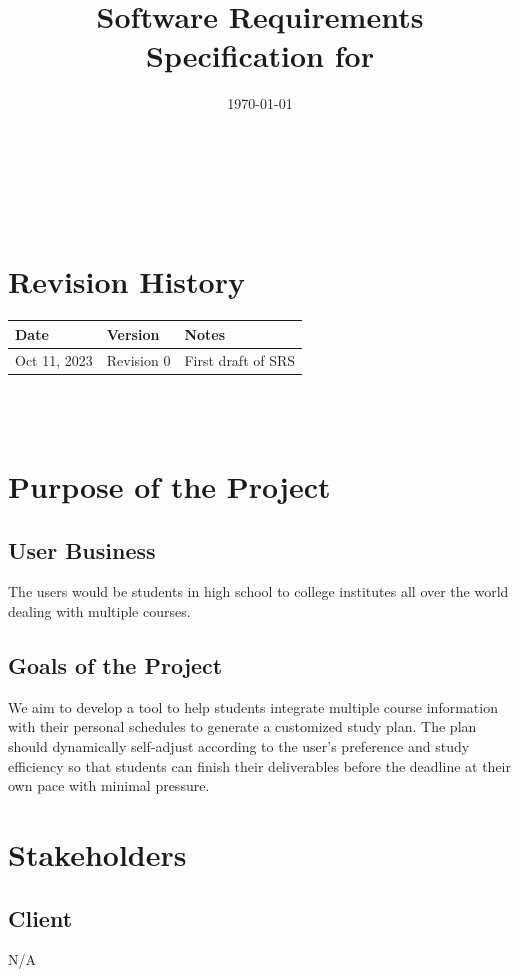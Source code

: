 \documentclass[12pt]{article}
\begin{document}
\title{Software Requirements Specification for \progname} 
\author{\authname}
\date{\today}
	
\maketitle
~\newpage


\tableofcontents

~\newpage

\section*{Revision History}

\begin{tabularx}{\textwidth}{p{3cm}p{2cm}X}
\toprule {\textbf{Date}} & {\textbf{Version}} & {\textbf{Notes}}\\
\midrule
Oct 11, 2023 & Revision 0 & First draft of SRS \\
\bottomrule
\end{tabularx}

~\\

~\newpage
\section{Purpose of the Project}
\subsection{User Business}
The users would be students in high school to college institutes all over the world dealing with multiple courses.
\subsection{Goals of the Project}
We aim to develop a tool to help students integrate multiple course information with their personal schedules to generate a customized study plan. The plan should dynamically self-adjust according to the user's preference and study efficiency so that students can finish their deliverables before the deadline at their own pace with minimal pressure.
\section{Stakeholders}
\subsection{Client}
N/A
\end{document}
